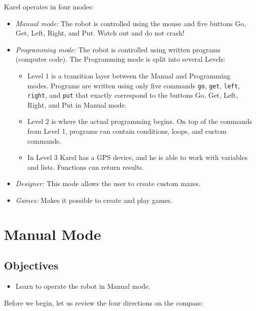 \documentclass[article,A4,12pt]{llncs}
\begin{document}
Karel operates in four modes:
\begin{itemize}
\item {\em Manual mode:} The robot is controlled using the mouse and five buttons Go, Get, Left, Right, and Put. 
      Watch out and do not crash!
\item {\em Programming mode:} The robot is controlled using written programs (computer code). The Programming mode is 
      split into several Levels:
\begin{itemize}
\item Level 1 is a transition layer between the Manual and Programming modes. Programs are written using only 
      five commands {\tt go}, {\tt get}, {\tt left}, {\tt right}, and {\tt put} that exactly correspond to 
      the buttons Go, Get, Left, Right, and Put in Manual mode.
\item Level 2 is where the actual programming begins. On top of the commands from Level 1, programs can contain 
      conditions, loops, and custom commands.
\item In Level 3 Karel has a GPS device, and he is able to work with variables and lists. Functions
      can return results.
\end{itemize}
\item {\em Designer:} This mode allows the user to create custom mazes.
\item {\em Games:} Makes it possible to create and play games. 
\end{itemize}


\section{Manual Mode} \label{sec:manual}

\subsection{Objectives} 
\begin{itemize}
\item Learn to operate the robot in Manual mode.
\end{itemize}
\noindent
Before we begin, let us review the four directions on the compass:\\[-7mm]
\end{document}
